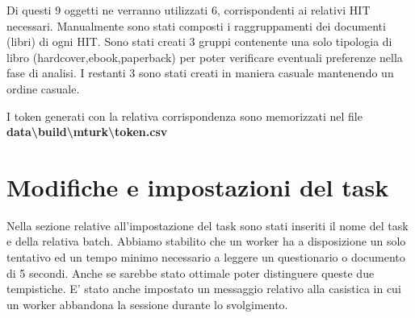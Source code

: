 \documentclass[a4paper,11pt]{report}
\begin{document}
Di questi 9 oggetti ne verranno utilizzati 6, corrispondenti ai relativi HIT necessari. Manualmente sono stati composti i raggruppamenti dei documenti (libri) di ogni HIT. Sono stati creati 3 gruppi contenente una solo tipologia di libro (hardcover,ebook,paperback) per poter verificare eventuali preferenze nella fase di analisi. I restanti 3 sono stati creati in maniera casuale mantenendo un ordine casuale.

I token generati con la relativa corrispondenza sono memorizzati nel file \textbf{data\textbackslash build\textbackslash mturk\textbackslash token.csv}

\section{Modifiche e impostazioni del task}
Nella sezione relative all'impostazione del task sono stati inseriti il nome del task e della relativa batch. Abbiamo stabilito che un worker ha a disposizione un solo tentativo ed un tempo minimo necessario a leggere un questionario o documento di 5 secondi. Anche se sarebbe stato ottimale poter distinguere queste due tempistiche. E' stato anche impostato un messaggio relativo alla casistica in cui un worker abbandona la sessione durante lo svolgimento.
\end{document}
